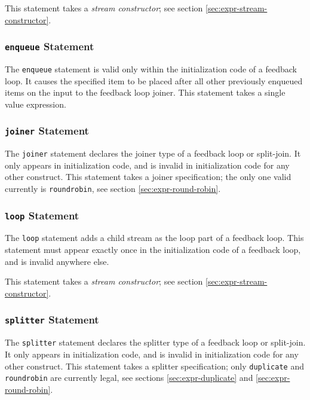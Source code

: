 \documentclass[11pt]{article}
\begin{document}
This statement takes a \emph{stream constructor}; see section
\ref{sec:expr-stream-constructor}.

\subsubsection{\lstinline|enqueue| Statement}

The \lstinline|enqueue| statement is valid only within the
initialization code of a feedback loop.  It causes the specified item
to be placed after all other previously enqueued items on the input to
the feedback loop joiner.  This statement takes a single value
expression.

\subsubsection{\lstinline|joiner| Statement}

The \lstinline|joiner| statement declares the joiner type of a feedback
loop or split-join.  It only appears in initialization code, and is
invalid in initialization code for any other construct.  This
statement takes a joiner specification; the only one valid currently
is \lstinline|roundrobin|, see section \ref{sec:expr-round-robin}.

\subsubsection{\lstinline|loop| Statement}

The \lstinline|loop| statement adds a child stream as the loop part of a
feedback loop.  This statement must appear exactly once in the
initialization code of a feedback loop, and is invalid anywhere else.

This statement takes a \emph{stream constructor}; see section
\ref{sec:expr-stream-constructor}.

\subsubsection{\lstinline|splitter| Statement}

The \lstinline|splitter| statement declares the splitter type of a feedback
loop or split-join.  It only appears in initialization code, and is
invalid in initialization code for any other construct.  This
statement takes a splitter specification; only \lstinline|duplicate| and
\lstinline|roundrobin| are currently legal, see sections
\ref{sec:expr-duplicate} and \ref{sec:expr-round-robin}.
\end{document}

